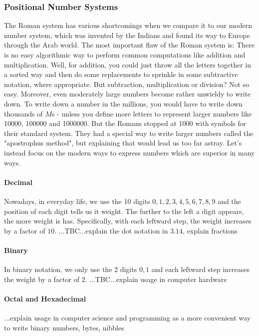 \subsubsection{Positional Number Systems}
The Roman system has various shortcomings when we compare it to our modern number system, which was invented by the Indians and found its way to Europe through the Arab world. The most important flaw of the Roman system is: There is no easy algorithmic way to perform common computations like addition and multiplication. Well, for addition, you could just throw all the letters together in a sorted way and then do some replacements to sprinkle in some subtractive notation, where appropriate. But subtraction, multiplication or division? Not so easy. Moreover, even moderately large numbers become rather unwieldy to write down. To write down a number in the millions, you would have to write down thousands of $M$s - unless you define more letters to represent larger numbers like 10000, 100000 and 1000000. But the Romans stopped at 1000 with symbols for their standard system. They had a special way to write larger numbers called the "apostrophus method", but explaining that would lead us too far astray. Let's instead focus on the modern ways to express numbers which are superior in many ways.



\paragraph{Decimal}
Nowadays, in everyday life, we use the 10 digits $0,1,2,3,4,5,6,7,8,9$ and the position of each digit tells us it weight. The further to the left a digit appears, the more weight is has. Specifically, with each leftward step, the weight increases by a factor of $10$. ...TBC...explain the dot notation in $3.14$, explain fractions




\paragraph{Binary}
In binary notation, we only use the 2 digits $0,1$ and each leftward step increases the weight by a factor of $2$. ...TBC...explain usage in computer hardware

\paragraph{Octal and Hexadecimal}
...explain usage in computer science and programming as a more convenient way to write binary numbers, bytes, nibbles


